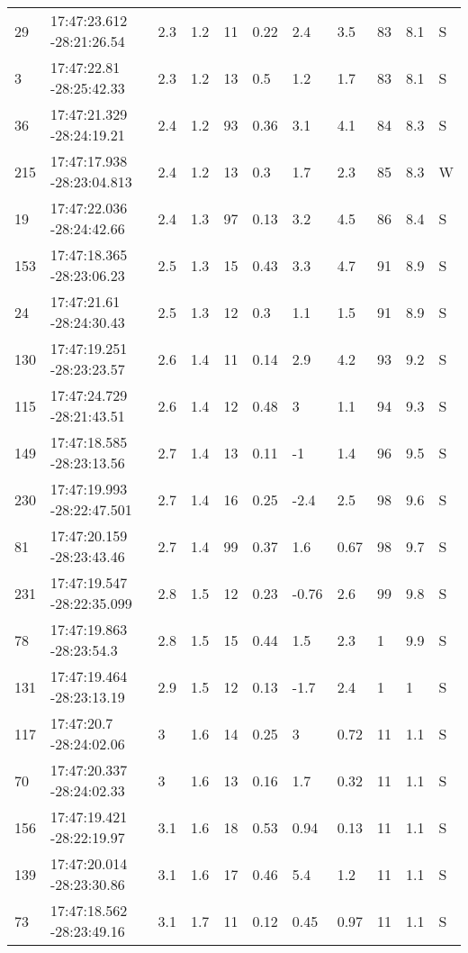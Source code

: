 \begin{deluxetable}[htp]
\begin{tabular}{lllllllllll}
29 & 17:47:23.612 -28:21:26.54 & 2.3 & 1.2 & 11 & 0.22 & 2.4 & 3.5 & 83 & 8.1\ee{24} & S \\
3 & 17:47:22.81 -28:25:42.33 & 2.3 & 1.2 & 13 & 0.5 & 1.2 & 1.7 & 83 & 8.1\ee{24} & S \\
36 & 17:47:21.329 -28:24:19.21 & 2.4 & 1.2 & 93 & 0.36 & 3.1 & 4.1 & 84 & 8.3\ee{24} & S \\
215 & 17:47:17.938 -28:23:04.813 & 2.4 & 1.2 & 13 & 0.3 & 1.7 & 2.3 & 85 & 8.3\ee{24} & W \\
19 & 17:47:22.036 -28:24:42.66 & 2.4 & 1.3 & 97 & 0.13 & 3.2 & 4.5 & 86 & 8.4\ee{24} & S \\
153 & 17:47:18.365 -28:23:06.23 & 2.5 & 1.3 & 15 & 0.43 & 3.3 & 4.7 & 91 & 8.9\ee{24} & S \\
24 & 17:47:21.61 -28:24:30.43 & 2.5 & 1.3 & 12 & 0.3 & 1.1 & 1.5 & 91 & 8.9\ee{24} & S \\
130 & 17:47:19.251 -28:23:23.57 & 2.6 & 1.4 & 11 & 0.14 & 2.9 & 4.2 & 93 & 9.2\ee{24} & S \\
115 & 17:47:24.729 -28:21:43.51 & 2.6 & 1.4 & 12 & 0.48 & 3 & 1.1 & 94 & 9.3\ee{24} & S \\
149 & 17:47:18.585 -28:23:13.56 & 2.7 & 1.4 & 13 & 0.11 & -1 & 1.4 & 96 & 9.5\ee{24} & S \\
230 & 17:47:19.993 -28:22:47.501 & 2.7 & 1.4 & 16 & 0.25 & -2.4 & 2.5 & 98 & 9.6\ee{24} & S \\
81 & 17:47:20.159 -28:23:43.46 & 2.7 & 1.4 & 99 & 0.37 & 1.6 & 0.67 & 98 & 9.7\ee{24} & S \\
231 & 17:47:19.547 -28:22:35.099 & 2.8 & 1.5 & 12 & 0.23 & -0.76 & 2.6 & 99 & 9.8\ee{24} & S \\
78 & 17:47:19.863 -28:23:54.3 & 2.8 & 1.5 & 15 & 0.44 & 1.5 & 2.3 & 1 & 9.9\ee{24} & S \\
131 & 17:47:19.464 -28:23:13.19 & 2.9 & 1.5 & 12 & 0.13 & -1.7 & 2.4 & 1 & 1\ee{25} & S \\
117 & 17:47:20.7 -28:24:02.06 & 3 & 1.6 & 14 & 0.25 & 3 & 0.72 & 11 & 1.1\ee{25} & S \\
70 & 17:47:20.337 -28:24:02.33 & 3 & 1.6 & 13 & 0.16 & 1.7 & 0.32 & 11 & 1.1\ee{25} & S \\
156 & 17:47:19.421 -28:22:19.97 & 3.1 & 1.6 & 18 & 0.53 & 0.94 & 0.13 & 11 & 1.1\ee{25} & S \\
139 & 17:47:20.014 -28:23:30.86 & 3.1 & 1.6 & 17 & 0.46 & 5.4 & 1.2 & 11 & 1.1\ee{25} & S \\
73 & 17:47:18.562 -28:23:49.16 & 3.1 & 1.7 & 11 & 0.12 & 0.45 & 0.97 & 11 & 1.1\ee{25} & S \\

\end{tabular}
\end{deluxetable}

